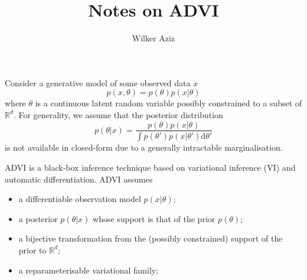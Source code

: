 \documentclass[11pt]{article}
\title{Notes on ADVI}
\author{Wilker Aziz}
\begin{document}
\maketitle


Consider a generative model of some observed data $x$ 
\begin{equation}
p(x, \theta) = p(\theta)p(x|\theta)
\end{equation}
 where $\theta$ is a continuous latent random variable possibly constrained to a subset of $\mathbb R^d$.
 For generality, we assume that the posterior distribution
 \begin{equation}
 	p(\theta|x) = \frac{p(\theta)p(x|\theta)}{\int p(\theta')p(x|\theta') \mathrm{d}\theta'}
 \end{equation}
 is not available in closed-form due to a generally intractable marginalisation.
 
ADVI \citep{KucukelbirEtAl2016ADVI} is a black-box inference technique based on variational inference (VI) \citep{JordanEtAl1999VI,BleiEtAl2017VI} and automatic differentiation. 
ADVI assumes
\begin{itemize}
	\item a differentiable observation model $p(x|\theta)$;
	\item a posterior $p(\theta|x)$ whose support is that of the prior $p(\theta)$;
	\item a bijective transformation from the (possibly constrained) support of the prior to $\mathbb R^d$;
	\item a reparameterisable variational family;
\end{itemize}
\end{document}
